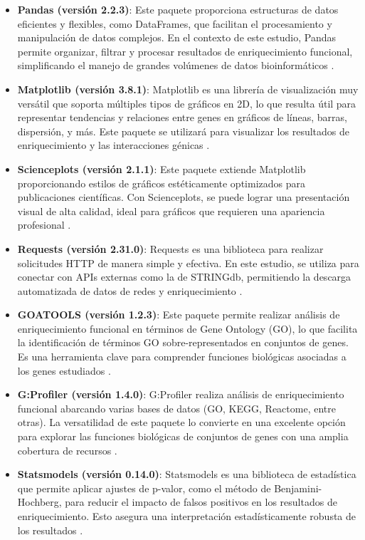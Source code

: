 \begin{itemize}
	\item \textbf{Pandas (versión 2.2.3)}: Este paquete proporciona estructuras de datos eficientes y flexibles, como DataFrames, que facilitan el procesamiento y manipulación de datos complejos. En el contexto de este estudio, Pandas permite organizar, filtrar y procesar resultados de enriquecimiento funcional, simplificando el manejo de grandes volúmenes de datos bioinformáticos \cite{pandas}.
	\item \textbf{Matplotlib (versión 3.8.1)}: Matplotlib es una librería de visualización muy versátil que soporta múltiples tipos de gráficos en 2D, lo que resulta útil para representar tendencias y relaciones entre genes en gráficos de líneas, barras, dispersión, y más. Este paquete se utilizará para visualizar los resultados de enriquecimiento y las interacciones génicas \cite{matplotlib}.
	\item \textbf{Scienceplots (versión 2.1.1)}: Este paquete extiende Matplotlib proporcionando estilos de gráficos estéticamente optimizados para publicaciones científicas. Con Scienceplots, se puede lograr una presentación visual de alta calidad, ideal para gráficos que requieren una apariencia profesional \cite{scienceplots}.
	\item \textbf{Requests (versión 2.31.0)}: Requests es una biblioteca para realizar solicitudes HTTP de manera simple y efectiva. En este estudio, se utiliza para conectar con APIs externas como la de STRINGdb, permitiendo la descarga automatizada de datos de redes y enriquecimiento \cite{requests}.
	\item \textbf{GOATOOLS (versión 1.2.3)}: Este paquete permite realizar análisis de enriquecimiento funcional en términos de Gene Ontology (GO), lo que facilita la identificación de términos GO sobre-representados en conjuntos de genes. Es una herramienta clave para comprender funciones biológicas asociadas a los genes estudiados \cite{goatools}.
	\item \textbf{G:Profiler (versión 1.4.0)}: G:Profiler realiza análisis de enriquecimiento funcional abarcando varias bases de datos (GO, KEGG, Reactome, entre otras). La versatilidad de este paquete lo convierte en una excelente opción para explorar las funciones biológicas de conjuntos de genes con una amplia cobertura de recursos \cite{gprofiler}.
	\item \textbf{Statsmodels (versión 0.14.0)}: Statsmodels es una biblioteca de estadística que permite aplicar ajustes de p-valor, como el método de Benjamini-Hochberg, para reducir el impacto de falsos positivos en los resultados de enriquecimiento. Esto asegura una interpretación estadísticamente robusta de los resultados \cite{statsmodels}.
\end{itemize}

